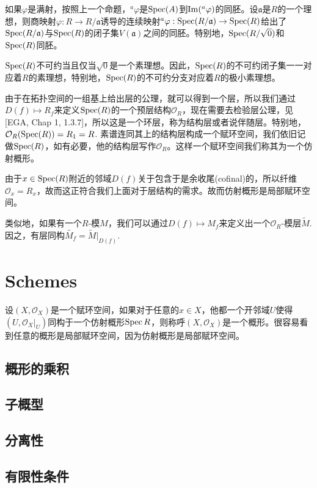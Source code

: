 \para 如果$\varphi$是满射，按照上一个命题，$^a\varphi$是$\operatorname{Spec}(A)$到$\operatorname{Im} (^a\varphi)$的同胚。设$\mathfrak{a}$是$R$的一个理想，则商映射$\varphi:R\to R/\mathfrak{a}$诱导的连续映射$^a\varphi:\operatorname{Spec}(R/\mathfrak{a})\to \operatorname{Spec}(R)$给出了$\operatorname{Spec}(R/\mathfrak{a})$与$\operatorname{Spec}(R)$的闭子集$V(\mathfrak{a})$之间的同胚。特别地，$\operatorname{Spec}(R/\sqrt{0})$和$\operatorname{Spec}(R)$同胚。

\para $\operatorname{Spec}(R)$不可约当且仅当$\sqrt{0}$是一个素理想。因此，$\operatorname{Spec}(R)$的不可约闭子集一一对应着$R$的素理想，特别地，$\operatorname{Spec}(R)$的不可约分支对应着$R$的极小素理想。

\para 由于在拓扑空间的一组基上给出层的公理，就可以得到一个层，所以我们通过$D(f)\mapsto R_f$来定义$\operatorname{Spec}(R)$的一个预层结构$\mathcal{O}_R$，现在需要去检验层公理，见[EGA, Chap 1, 1.3.7]，所以这是一个环层，称为结构层或者说伴随层。特别地，$\mathcal{O}_R(\operatorname{Spec}(R))=R_1=R$. 素谱连同其上的结构层构成一个赋环空间，我们依旧记做$\operatorname{Spec}(R)$，如有必要，他的结构层写作$\mathcal{O}_R$。这样一个赋环空间我们称其为一个仿射概形。

由于$x\in \operatorname{Spec}(R)$附近的邻域$D(f)$关于包含于是余收尾(cofinal)的，所以纤维$\mathcal{O}_x=R_x$，故而这正符合我们上面对于层结构的需求。故而仿射概形是局部赋环空间。

\para 类似地，如果有一个$R$-模$M$，我们可以通过$D(f)\mapsto M_f$来定义出一个$\mathcal{O}_R$-模层$\widetilde{M}$. 因之，有层同构$\widetilde{M_f}=\widetilde{M}|_{D(f)}$.

\section{Schemes}

\para 设$(X,\mathcal{O}_X)$是一个赋环空间，如果对于任意的$x\in X$，他都一个开邻域$U$使得$(U,\mathcal{O}_X|_U)$同构于一个仿射概形$\operatorname{Spec}{R}$，则称呼$(X,\mathcal{O}_X)$是一个概形。很容易看到任意的概形是局部赋环空间，因为仿射概形是局部赋环空间。

\subsection{概形的乘积}

\subsection{子概型}

\subsection{分离性}

\subsection{有限性条件}